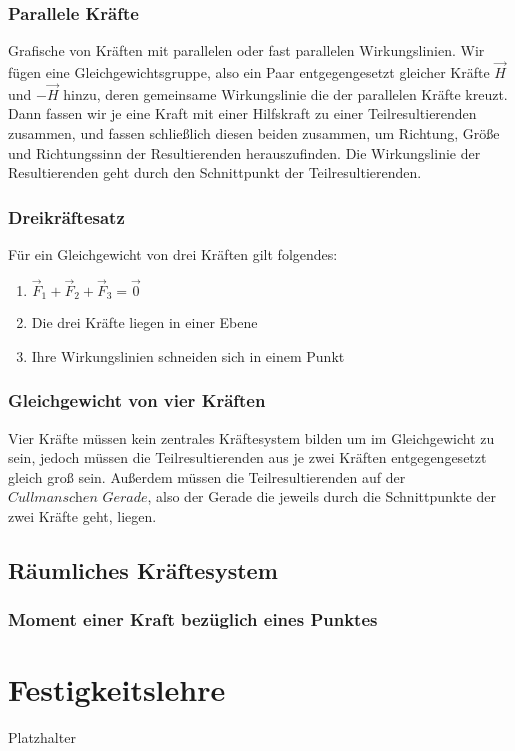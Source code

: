\documentclass[a4paper,parskip=half*,DIV=7,fontsize=11pt]{scrartcl}
\begin{document}
\subsubsection{Parallele Kräfte}
Grafische von Kräften mit parallelen oder fast parallelen Wirkungslinien.
Wir fügen eine Gleichgewichtsgruppe, also ein Paar entgegengesetzt gleicher Kräfte $\overrightarrow{H}$ und $-\overrightarrow{H}$ hinzu, deren gemeinsame Wirkungslinie die der parallelen Kräfte kreuzt.\\
Dann fassen wir je eine Kraft mit einer Hilfskraft zu einer Teilresultierenden zusammen, und fassen schließlich diesen beiden zusammen, um Richtung, Größe und Richtungssinn der Resultierenden herauszufinden. Die Wirkungslinie der Resultierenden geht durch den Schnittpunkt der Teilresultierenden.

\subsubsection{Dreikräftesatz}
Für ein Gleichgewicht von drei Kräften gilt folgendes:
\begin{enumerate}
	\item $\overrightarrow{F}_1+\overrightarrow{F}_2+\overrightarrow{F}_3=\overrightarrow{0}$
	\item Die drei Kräfte liegen in einer Ebene
	\item Ihre Wirkungslinien schneiden sich in einem Punkt
\end{enumerate}

\subsubsection{Gleichgewicht von vier Kräften}
Vier Kräfte müssen kein zentrales Kräftesystem bilden um im Gleichgewicht zu sein, jedoch müssen die Teilresultierenden aus je zwei Kräften entgegengesetzt gleich groß sein. Außerdem müssen die Teilresultierenden auf der $\textit{Cullmanschen Gerade}$, also der Gerade die jeweils durch die Schnittpunkte der zwei Kräfte geht, liegen.

\subsection{Räumliches Kräftesystem}
\subsubsection{Moment einer Kraft bezüglich eines Punktes}


\pagebreak

\section{Festigkeitslehre}
Platzhalter
\end{document}

